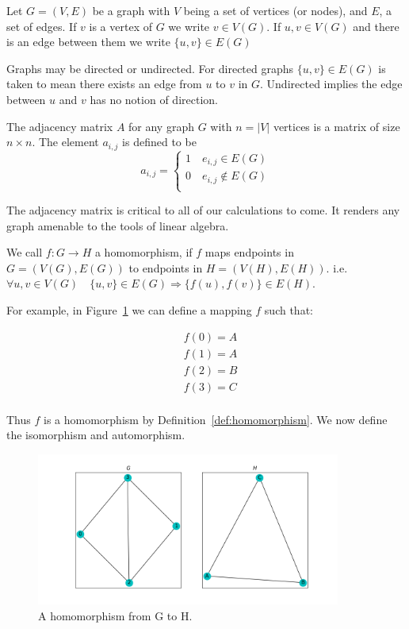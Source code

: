 \begin{dfn}
    Let $G = (V,E)$ be a graph with $V$ being a set of vertices (or nodes), 
and $E$, a set of edges. If $v$ is a vertex of $G$ we write $v \in V(G)$. 
If $u,v \in V(G)$ and there is an edge between them we 
write $\{u,v\} \in E(G)$
\end{dfn}

Graphs may be directed or undirected. For directed graphs $\{u,v\} \in E(G)$
is taken to mean there exists an edge from $u$ to $v$ in $G$. Undirected implies the 
edge between $u$ and $v$ has no notion of direction.

\begin{dfn}
    The adjacency matrix $A$ for any graph $G$ with $n=|V|$ vertices is a matrix of size
    $n \times n$. The element $a_{i,j}$ is defined to be
    $$
    a_{i,j} = 
    \begin{cases}
        1 \quad e_{i,j} \in E(G)\\
        0 \quad e_{i,j} \not \in E(G)\\
    \end{cases}
    $$
    \label{def:adjmat}
\end{dfn}

\noindent The adjacency matrix is critical to all of our calculations to come. It renders
any graph amenable to the tools of linear algebra.

\begin{dfn}
\label{def:homomorphism}
We call $f: G \rightarrow H$ a homomorphism,
if $f$ maps endpoints in $G=(V(G),E(G))$ to endpoints in $H=(V(H),E(H))$.
i.e. $ \forall u,v \in V(G) \quad \{u,v\} \in E(G) \Rightarrow \{f(u),
f(v)\} \in E(H)$.
\end{dfn}


\noindent  For example, in Figure~\ref{fig:homomorphism} we can define a mapping $f$ such that:

\begin{align*}
    &f(0) = A\\
    &f(1) = A\\
    &f(2) = B\\
    &f(3) = C\\ 
\end{align*}

\noindent Thus $f$ is a homomorphism by Definition~\ref{def:homomorphism}. 
We now define the isomorphism and automorphism.


\begin{figure}[h!]
    \includegraphics[width=10cm]{Images/graph_homomorphism.png}
    \centering
    \caption{A homomorphism from G to H.}
    \label{fig:homomorphism}
\end{figure}


